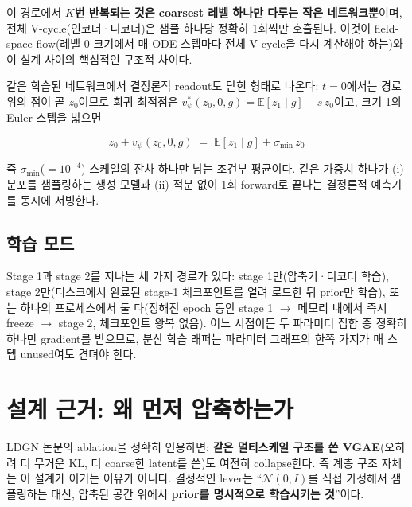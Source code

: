 \documentclass[11pt]{article}
\begin{document}
이 경로에서 \textbf{$K$번 반복되는 것은 coarsest 레벨 하나만 다루는
작은 네트워크뿐}이며, 전체 V-cycle(인코더·디코더)은 샘플 하나당 정확히
1회씩만 호출된다. 이것이 field-space flow(레벨 0 크기에서 매 ODE
스텝마다 전체 V-cycle을 다시 계산해야 하는)와 이 설계 사이의 핵심적인
구조적 차이다.

같은 학습된 네트워크에서 결정론적 readout도 닫힌 형태로 나온다:
$t=0$에서는 경로 위의 점이 곧 $z_0$이므로 회귀 최적점은
$v_\psi^*(z_0,0,g)=\mathbb{E}[z_1\mid g]-s\,z_0$이고, 크기 1의 Euler
스텝을 밟으면

\begin{equation}
z_0 + v_\psi(z_0,0,g) \;=\; \mathbb{E}[z_1\mid g] + \sigma_{\min}\, z_0
\end{equation}

즉 $\sigma_{\min}$($=10^{-4}$) 스케일의 잔차 하나만 남는 조건부 평균이다.
같은 가중치 하나가 (i) 분포를 샘플링하는 생성 모델과 (ii) 적분 없이 1회
forward로 끝나는 결정론적 예측기를 동시에 서빙한다.

\subsection{학습 모드}

Stage 1과 stage 2를 지나는 세 가지 경로가 있다: stage 1만(압축기·디코더
학습), stage 2만(디스크에서 완료된 stage-1 체크포인트를 얼려 로드한 뒤
prior만 학습), 또는 하나의 프로세스에서 둘 다(정해진 epoch 동안 stage 1
$\to$ 메모리 내에서 즉시 freeze $\to$ stage 2, 체크포인트 왕복 없음). 어느
시점이든 두 파라미터 집합 중 정확히 하나만 gradient를 받으므로, 분산
학습 래퍼는 파라미터 그래프의 한쪽 가지가 매 스텝 unused여도 견뎌야
한다.

\section{설계 근거: 왜 먼저 압축하는가}

LDGN 논문의 ablation을 정확히 인용하면: \textbf{같은 멀티스케일 구조를 쓴
VGAE}(오히려 더 무거운 KL, 더 coarse한 latent를 쓴)도 여전히 collapse한다.
즉 계층 구조 자체는 이 설계가 이기는 이유가 아니다. 결정적인 lever는
``$\mathcal{N}(0,I)$를 직접 가정해서 샘플링하는 대신, 압축된 공간 위에서
\textbf{prior를 명시적으로 학습시키는 것}''이다.
\end{document}
